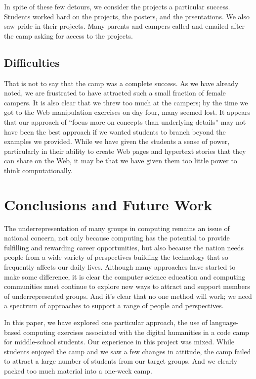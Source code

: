 In spite of these few detours, we consider the projects a particular
success.  Students worked hard on the projects, the posters, and
the prsentations.  We also saw pride in their projects.  Many parents
and campers called and emailed after the camp asking for access
to the projects.

\subsection{Difficulties}

That is not to say that the camp was a complete success.  As we
have already noted, we are frustrated to have attracted such a small
fraction of female campers.  It is also clear that we threw too
much at the campers; by the time we got to the Web manipulation
exercises on day four, many seemed lost.  It appears that our
approach of ``focus more on concepts than underlying details'' may
not have been the best approach if we wanted students to branch
beyond the examples we provided.  While we have given the students
a sense of power, particularly in their ability to create Web pages
and hypertext stories that they can share on the Web, it may be
that we have given them too little power to think computationally.

\section{Conclusions and Future Work}

The underrepresentation of many groups in computing remains an issue
of national concern, not only because computing has the potential
to provide fulfilling and rewarding career opportunities, but also
because the nation needs people from a wide variety of perspectives
building the technology that so frequently affects our daily lives.
Although many approaches have started to make some difference, it
is clear the computer science education and computing communities
must continue to explore new ways to attract and support members
of underrepresented groups.  And it's clear that no one method will
work; we need a spectrum of approaches to support a range of
people and perspectives.

In this paper, we have explored one particular approach, the use
of language-based computing exercises associated with the digital
humanities in a code camp for middle-school students.  Our experience
in this project was mixed.  While students enjoyed the camp
and we saw a few changes in attitude, the camp failed to attract a
large number of students from our target groups.  And we clearly
packed too much material into a one-week camp.

